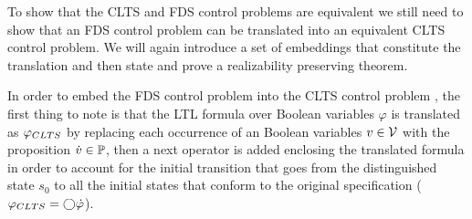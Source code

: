 
To show that the CLTS and FDS control problems are equivalent we  still need to show that an FDS control problem can be translated into an equivalent CLTS control problem. We will again introduce a set of embeddings that constitute the translation and then state and prove a realizability preserving theorem.

In order to embed the FDS control problem \fdsControlProblemDef into the CLTS control problem \cltsCPEmbeddingDef, the first thing to note is that the LTL formula over Boolean variables $\varphi$ is translated as $\varphi_{CLTS}$ by replacing each occurrence of an Boolean variables $v \in {\ensuremath{\mathcal{V}}}$ with the proposition $\dot{v} \in \mathbb{P}$, then a next operator is added enclosing the translated formula in order to account for the initial transition that goes from the distinguished state $s_0$ to all the initial states that conform to the original specification ($\varphi_{CLTS} = \bigcirc \dot{\varphi}$).

%	

